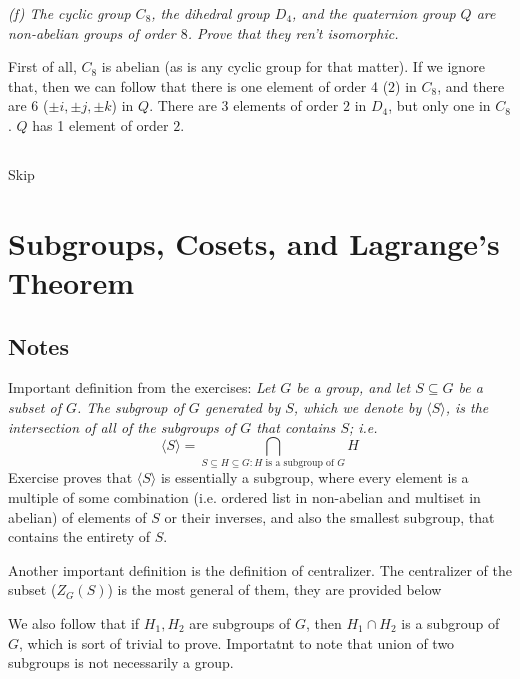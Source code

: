 \documentclass[11pt,oneside,titlepage]{book}
\newcommand{\eangle}[1]{\langle #1 \rangle}
\begin{document}
\textit{(f) The cyclic group $C_8$, the dihedral group $D_4$, and the quaternion group
  $Q$ are non-abelian groups of order $8$. Prove that they ren't isomorphic.}

First of all, $C_8$ is abelian (as is any cyclic group for that
matter). If we ignore that, then we can follow that there is one
element of order 4 ($2$) in $C_8$, and there are 6 ($\pm i, \pm j, \pm
k$) in $Q$. There are 3 elements of order $2$ in $D_4$, but only one
in $C_8$. $Q$ has 1 element of order $2$.

\subsection{}

Skip

\section{Subgroups, Cosets, and Lagrange's Theorem}

\subsection*{Notes}

Important definition from the exercises:
\textit{Let $G$ be a group, and let $S \subseteq G$ be a subset of
$G$. The subgroup of $G$ generated by $S$, which we denote by
$\eangle{S}$, is the intersection of all of the subgroups of $G$ that
contains $S$; i.e.
  $$\eangle{S} = \bigcap_{S \subseteq H \subseteq G: H\text{ is a subgroup of }G} H$$}
Exercise proves that $\eangle{S}$ is essentially a subgroup, where
every element is a multiple of some combination (i.e. ordered list in
non-abelian and multiset in abelian) of elements of $S$ or their
inverses, and also the smallest subgroup, that contains the entirety
of $S$.

Another important definition is the definition of centralizer.  The
centralizer of the subset ($Z_G(S)$) is the most general of them, they
are provided below

We also follow that if $H_1, H_2$ are subgroups of $G$, then $H_1 \cap
H_2$ is a subgroup of $G$, which is sort of trivial to prove. Importatnt
to note that union of two subgroups is not necessarily a group.

\subsection{}
\end{document}
